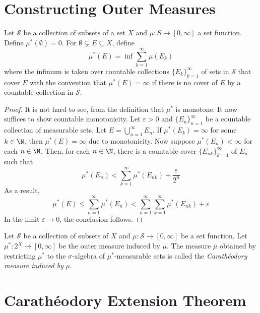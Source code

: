 \section{Constructing Outer Measures}
\begin{theorem}
    Let $\mathcal S$ be a collection of subsets of a set $X$ and $\mu: S\to[0,\infty]$ a set function. Define $\mu^*(\emptyset) = 0$. For $\emptyset\subsetneq E\subseteq X$, define 
    \begin{equation*}
        \mu^*(E) = \inf\sum_{k = 1}^\infty\mu(E_k)
    \end{equation*}
    where the infimum is taken over countable collections $\{E_k\}_{k = 1}^\infty$ of sets in $\mathcal S$ that cover $E$ with the convention that $\mu^*(E) = \infty$ if there is no cover of $E$ by a countable collection in $\mathcal S$.
\end{theorem}
\begin{proof}
    It is not hard to see, from the definition that $\mu^*$ is monotone. It now suffices to show countable monotonicity. Let $\varepsilon > 0$ and $\{E_n\}_{n = 1}^\infty$ be a countable collection of measurable sets. Let $E = \bigcup_{n = 1}^\infty E_n$. If $\mu^*(E_k) = \infty$ for some $k\in\N$, then $\mu^*(E) = \infty$ due to monotonicity. Now suppose $\mu^*(E_n) < \infty$ for each $n\in\N$. Then, for each $n\in\N$, there is a countable cover $\{E_{nk}\}_{k = 1}^\infty$ of $E_n$ such that 
    \begin{equation*}
        \mu^*(E_n) < \sum_{k = 1}^\infty\mu^*(E_{nk}) + \frac{\varepsilon}{2^n}
    \end{equation*}
    As a result,
    \begin{equation*}
        \mu^*(E)\le\sum_{n = 1}^\infty\mu^*(E_n) < \sum_{n = 1}^\infty\sum_{k = 1}^\infty\mu^*(E_{nk}) + \varepsilon
    \end{equation*}
    In the limit $\varepsilon\to0$, the conclusion follows.
\end{proof}

\begin{definition}
    Let $\mathcal S$ be a collection of subsets of $X$ and $\mu:\mathcal S\to[0,\infty]$ be a set function. Let $\mu^*: 2^X\to[0,\infty]$ be the outer measure induced by $\mu$. The measure $\overline\mu$ obtained by restricting $\mu^*$ to the $\sigma$-algebra of $\mu^*$-measurable sets is called the \textit{Carath\'eodory measure induced by} $\mu$.
\end{definition}

\section{Carath\'eodory Extension Theorem}

